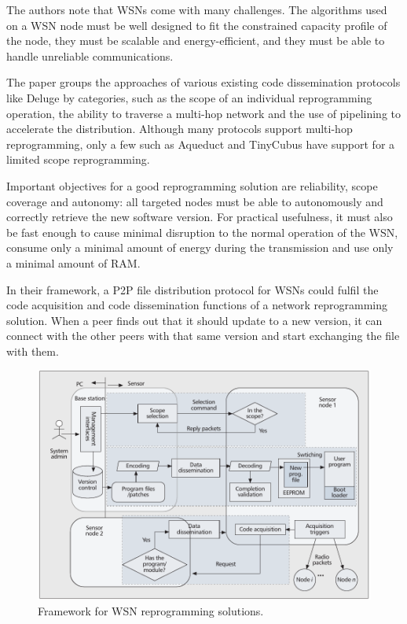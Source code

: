 The authors note that \glspl{WSN} come with many challenges. The algorithms used on a \gls{WSN} node must be well designed to fit the constrained capacity profile of the node, they must be scalable and energy-efficient, and they must be able to handle unreliable communications.

The paper groups the approaches of various existing code dissemination protocols like Deluge by categories, such as the scope of an individual reprogramming operation, the ability to traverse a multi-hop network and the use of pipelining to accelerate the distribution. Although many protocols support multi-hop reprogramming, only a few such as Aqueduct and TinyCubus have support for a limited scope reprogramming.

Important objectives for a good reprogramming solution are reliability, scope coverage and autonomy: all targeted nodes must be able to autonomously and correctly retrieve the new software version. For practical usefulness, it must also be fast enough to cause minimal disruption to the normal operation of the \gls{WSN}, consume only a minimal amount of energy during the transmission and use only a minimal amount of \gls{RAM}.

In their framework, a \gls{P2P} file distribution protocol for \glspl{WSN} could fulfil the code acquisition and code dissemination functions of a network reprogramming solution. When a peer finds out that it should update to a new version, it can connect with the other peers with that same version and start exchanging the file with them.

\begin{figure}
    \centering
    \includegraphics[width=\textwidth]{images/wang-reprogramming-framework.pdf}
    \caption[Framework for WSN reprogramming solutions]{Framework for WSN reprogramming solutions. \cite{wang-reprogramming}}
    \label{fig:related:wang-framework}
\end{figure}

